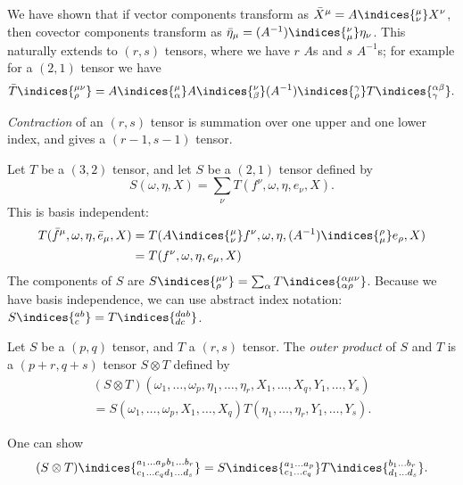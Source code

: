 \documentclass{jknotes}
\begin{document}
We have shown that if vector components transform as \(\bar{X}^\mu = A\indices{^\mu_\nu}X^\nu\), then covector components transform as \(\bar{\eta}_\mu = (A^{-1})\indices{^\nu_\mu}\eta_\nu\). This naturally extends to \((r,s)\) tensors, where we have \(r\) \(A\)s and \(s\) \(A^{-1}\)s; for example for a \((2,1)\) tensor we have
\begin{equation}
    \bar{T}\indices{^{\mu\nu}_\rho} = A\indices{^\mu_\alpha}A\indices{^\nu_\beta}(A^{-1})\indices{^\gamma_\rho}T\indices{^{\alpha\beta}_\gamma}.
\end{equation}

\begin{defn}
    \emph{Contraction} of an \((r,s)\) tensor is summation over one upper and one lower index, and gives a \((r-1,s-1)\) tensor.
\end{defn}

\begin{eg}
    Let \(T\) be a \((3,2)\) tensor, and let \(S\) be a \((2,1)\) tensor defined by
    \begin{equation}
        S(\omega,\eta,X) = \sum_\nu T(f^\nu,\omega,\eta,e_\nu,X).
    \end{equation}
    This is basis independent:
    \begin{align}
        T(\bar{f}^\mu,\omega,\eta,\bar{e}_\mu,X) &= T(A\indices{^\mu_\nu}f^\nu,\omega,\eta,(A^{-1})\indices{^\rho_\mu}e_\rho,X) \\
                                                 &= T(f^\nu,\omega,\eta,e_\mu,X)
    \end{align}
    The components of \(S\) are \(S\indices{^{\mu\nu}_\rho} = \sum_\alpha T\indices{^{\alpha\mu\nu}_{\alpha\rho}}\). Because we have basis independence, we can use abstract index notation: \(S\indices{^{ab}_c} = T\indices{^{dab}_{dc}}\).
\end{eg}

\begin{defn}
    Let \(S\) be a \((p,q)\) tensor, and \(T\) a \((r,s)\) tensor. The \emph{outer product} of \(S\) and \(T\) is a \((p+r,q+s)\) tensor \(S\otimes T\) defined by
    \begin{multline}
        (S\otimes T)(\omega_1,\dots,\omega_p,\eta_1,\dots,\eta_r,X_1,\dots,X_q,Y_1,\dots,Y_s) \\
        = S(\omega_1,\dots,\omega_p,X_1,\dots,X_q)T(\eta_1,\dots,\eta_r,Y_1,\dots,Y_s).
    \end{multline}
\end{defn}
One can show
\begin{equation}
    (S\otimes T)\indices{^{a_1\dots a_p b_1\dots b_r}_{c_1\dots c_q d_1\dots d_s}} = S\indices{^{a_1\dots a_p}_{c_1\dots c_q}} T\indices{^{b_1\dots b_r}_{d_1\dots d_s}}.
\end{equation}
\end{document}
